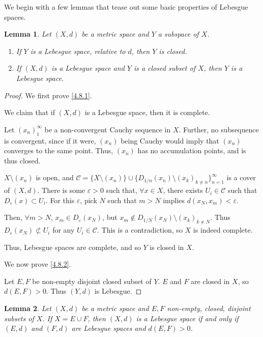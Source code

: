 \documentclass[openany, amssymb, psamsfonts]{amsart}
\newtheorem{lem}{Lemma}[section]
\theoremstyle{definition}
\numberwithin{equation}{section}
\begin{document}
We begin with a few lemmas that tease out some basic properties of Lebesgue spaces.
\begin{lem}\label{lem:4.8}
  Let $(X,d)$ be a metric space and $Y$ a subspace of $X$. 

  \begin{enumerate}
    \item If $Y$ is a Lebesgue space, relative to $d$, then $Y$ is closed. \label{4.8.1}
    \item If $(X,d)$ is a Lebesgue space and $Y$ is a closed subset of $X$, then $Y$ is a Lebesgue space. \label{4.8.2}
  \end{enumerate}  
\end{lem}
\begin{proof}
  We first prove \ref{4.8.1}.

  We claim that if $(X,d)$ is a Lebesgue space, then it is complete. 

  Let $(x_n)_1^\infty$ be a non-convergent Cauchy sequence in $X$. Further, no subsequence is convergent, since if it were, $(x_n)$ being Cauchy would imply that $(x_n)$ converges to the same point. Thus, $(x_n)$ has no accumulation points, and is thus closed. 

  $X \setminus (x_n)$ is open, and $\mathcal{C} = \{X \setminus (x_n)\} \cup \{D_{1/n}(x_n) \setminus (x_k)_{k\neq n}\}_{n=1}^\infty$ is a cover of $(X,d)$. There is some $\varepsilon > 0$ such that, $\forall x \in X$, there exists $U_i \in \mathcal{C}$ such that $D_\varepsilon(x) \subset U_i$. For this $\varepsilon$, pick $N$ such that $m > N$ implies $d(x_N, x_m) <\varepsilon$. 

  Then, $\forall m > N$, $x_m \in D_\varepsilon(x_N)$, but $x_m \not\in D_{1/N}(x_N) \setminus (x_k)_{k\neq N}$. Thus $D_{\varepsilon}(x_N) \not\subset U_i$  for any $U_i \in \mathcal{C}$. This is a contradiction, so $X$ is indeed complete. 

  Thus, Lebesgue spaces are complete, and so $Y$ is closed in $X$. 

  We now prove \ref{4.8.2}. 

  Let $E, F$ be non-empty disjoint closed subset of $Y$. $E$ and $F$ are closed in $X$, so $d(E,F) > 0$. Thus $(Y,d)$ is Lebesgue.
\end{proof}
\begin{lem}
  Let $(X,d)$ be a metric space and $E, F$ non-empty, closed, disjoint subsets of $X$. If $X = E \cup F$, then $(X, d)$ is a Lebesgue space if and only if $(E,d)$ and $(F,d)$ are Lebesgue spaces and $d(E,F) > 0$.
\end{lem}
\end{document}
